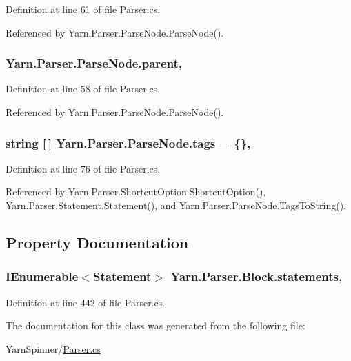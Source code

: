 Definition at line 61 of file Parser.\-cs.



Referenced by Yarn.\-Parser.\-Parse\-Node.\-Parse\-Node().

\hypertarget{a00142_af313a82103fcc2ff5a177dbb06b92f7b}{
\subsubsection[{parent}]{ Yarn.\-Parser.\-Parse\-Node.\-parent\hspace{0.3cm}{\ttfamily [package]}, {\ttfamily [inherited]}}}\label{a00142_af313a82103fcc2ff5a177dbb06b92f7b}


Definition at line 58 of file Parser.\-cs.



Referenced by Yarn.\-Parser.\-Parse\-Node.\-Parse\-Node().

\hypertarget{a00142_a58b3a15788fd2d4127d73619dc6d04ae}{
\subsubsection[{tags}]{\setlength{\rightskip}{0pt plus 5cm}string \mbox{[}$\,$\mbox{]} Yarn.\-Parser.\-Parse\-Node.\-tags = \{\}\hspace{0.3cm}{\ttfamily [package]}, {\ttfamily [inherited]}}}\label{a00142_a58b3a15788fd2d4127d73619dc6d04ae}


Definition at line 76 of file Parser.\-cs.



Referenced by Yarn.\-Parser.\-Shortcut\-Option.\-Shortcut\-Option(), Yarn.\-Parser.\-Statement.\-Statement(), and Yarn.\-Parser.\-Parse\-Node.\-Tags\-To\-String().



\subsection{Property Documentation}
\hypertarget{a00037_a42e3d555bbd5ecbdf61c45ad715be7e1}{
\subsubsection[{statements}]{\setlength{\rightskip}{0pt plus 5cm}I\-Enumerable$<${\bf Statement}$>$ Yarn.\-Parser.\-Block.\-statements\hspace{0.3cm}{\ttfamily [get]}, {\ttfamily [package]}}}\label{a00037_a42e3d555bbd5ecbdf61c45ad715be7e1}


Definition at line 442 of file Parser.\-cs.



The documentation for this class was generated from the following file\-:\begin{DoxyCompactItemize}
\item 
Yarn\-Spinner/\hyperlink{a00301}{Parser.\-cs}\end{DoxyCompactItemize}
